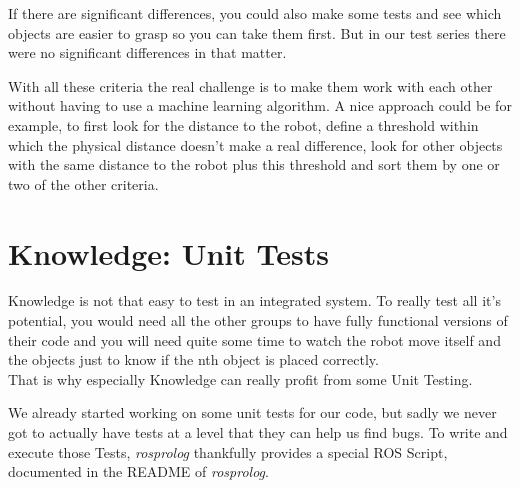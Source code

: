 \documentclass[main.tex]{subfiles}
\begin{document}
		If there are significant differences, you could also make some tests and see which objects are easier to grasp so you can take them first. But in our test series there were no significant differences in that matter. 
		
		With all these criteria the real challenge is to make them work with each other without having to use a machine learning algorithm. A nice approach could be for example, to first look for the distance to the robot, define a threshold within which the physical distance doesn't make a real difference, look for other objects with the same distance to the robot plus this threshold and sort them by one or two of the other criteria. 
		
		\section{Knowledge: Unit Tests}
		Knowledge is not that easy to test in an integrated system. To really test all it's potential, you would need all the other groups to have fully functional versions of their code and you will need quite some time to watch the robot move itself and the objects just to know if the nth object is placed correctly.\\
		That is why especially Knowledge can really profit from some Unit Testing.
		
		We already started working on some unit tests for our code, but sadly we never got to actually have tests at a level that they can help us find bugs. To write and execute those Tests, \textit{rosprolog} thankfully provides a special ROS Script, documented in the README of \textit{rosprolog}.


		
\end{document}
